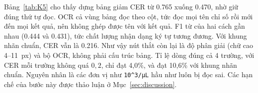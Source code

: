 Bảng~\ref{tab:K5} cho thấy dựng bảng giảm CER từ \num{0.765} xuống \num{0.470}, nhờ giữ đúng thứ tự đọc.
OCR cả vùng bảng đọc theo cột, tức đọc mọi tên chỉ số rồi mới đến mọi kết quả, nên không ghép được tên với kết quả.
F1 từ của hai cách gần nhau (\num{0.444} và \num{0.431}), tức chất lượng nhận dạng ký tự tương đương.
Với khung nhãn chuẩn, CER vẫn là \num{0.216}.
Như vậy nút thắt còn lại là độ phân giải (chữ cao 4--11~px) và bộ OCR, không phải cấu trúc bảng.
Tỉ lệ dòng đúng cả 4 trường, với CER mỗi trường không quá $0{,}2$, chỉ đạt 4,0\%, và đạt 10,6\% với khung nhãn chuẩn.
Nguyên nhân là các đơn vị như \texttt{10\textasciicircum3/µL} hầu như luôn bị đọc sai.
Các hạn chế của bước này được thảo luận ở Mục~\ref{sec:discussion}.
